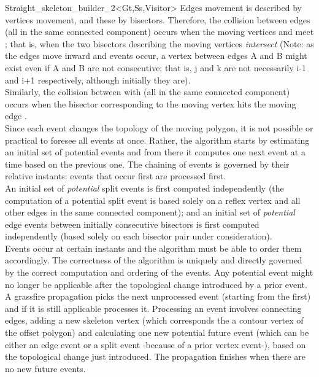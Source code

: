 \begin{ccRefClass}{Straight_skeleton_builder_2<Gt,Ss,Visitor>}
Edges movement is described by vertices movement, and these by bisectors. Therefore, the collision between edges  (all in the same connected component) occurs when the moving vertices  and  meet ; that is, when the two bisectors describing the moving vertices 
{\em intersect} (Note: as the edges move inward and events occur, a vertex between edges A and B might exist even if A and B are not consecutive; that is, j and k are not necessarily i-1 and i+1 respectively, although initially they are).\\
Similarly, the collision between  with  (all in the same connected component) occurs when the bisector corresponding to the moving vertex  hits the moving edge .\\
Since each event changes the topology of the moving polygon, it is not possible or practical to foresee all events at once. Rather, the algorithm starts by estimating an initial set of potential events and from there it computes one next event at a time based on the previous one. The chaining of events is governed by their relative instants: events that occur first are processed first.\\
An initial set of \textit{potential} split events is first computed independently (the computation of a potential split event is based solely on a reflex vertex and all other edges in the same connected component); and an initial set of \textit{potential} edge events between initially consecutive bisectors is first computed independently (based solely on each bisector pair under consideration).\\
Events occur at certain instants and the algorithm must be able to order them
accordingly. The correctness of the algorithm is uniquely and directly governed by the correct computation and ordering of the events. Any potential event might no longer be applicable after the topological change introduced by a prior event.\\
A grassfire propagation picks the next unprocessed event (starting from the first) and if it is still applicable processes it. Processing an event involves connecting edges, adding a new skeleton vertex (which corresponds the a contour vertex of the offset polygon) and calculating one new potential future event (which can be either an edge event or a split event -because of a prior vertex event-), based on the topological change just introduced. The propagation finishes when there are no new future events.


\end{ccRefClass}
